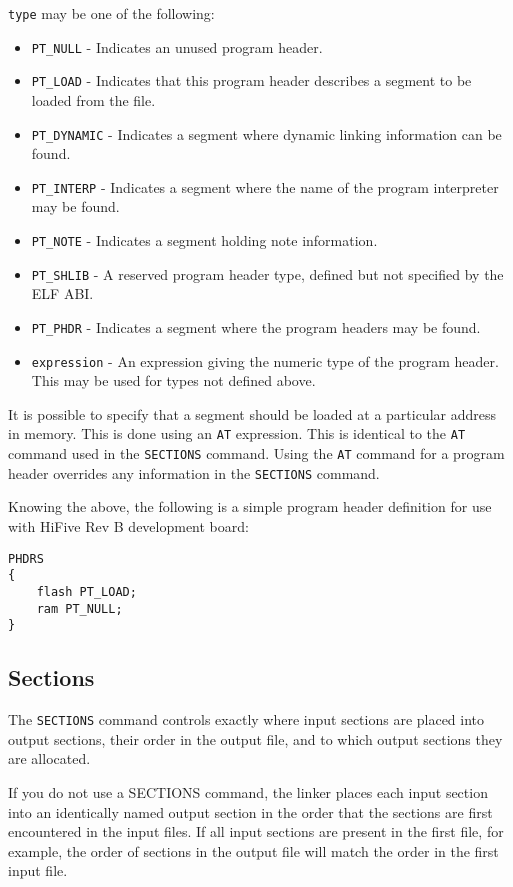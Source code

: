 \lstinline|type| may be one of the following\cite{gnuldProgramHeaders}:
\begin{itemize}
    \item \lstinline|PT_NULL| - Indicates an unused program header.
    \item \lstinline|PT_LOAD| - Indicates that this program header describes a segment to be loaded from the file.
    \item \lstinline|PT_DYNAMIC| - Indicates a segment where dynamic linking information can be found.
    \item \lstinline|PT_INTERP| - Indicates a segment where the name of the program interpreter may be found.
    \item \lstinline|PT_NOTE| - Indicates a segment holding note information.
    \item \lstinline|PT_SHLIB| - A reserved program header type, defined but not specified by the ELF ABI.
    \item \lstinline|PT_PHDR| - Indicates a segment where the program headers may be found.
    \item \lstinline|expression| - An expression giving the numeric type of the program header. This may be used for types not defined above.
\end{itemize}

It is possible to specify that a segment should be loaded at a particular address in memory. This is done using an \lstinline|AT| expression. This is identical to the \lstinline|AT| command used in the \lstinline|SECTIONS| command. Using the \lstinline|AT| command for a program header overrides any information in the \lstinline|SECTIONS| command.\cite{gnuldProgramHeaders}

Knowing the above, the following is a simple program header definition for use with HiFive Rev B development board:
\begin{lstlisting}
PHDRS
{
    flash PT_LOAD;
    ram PT_NULL;
}
\end{lstlisting}

\subsection{Sections}
The \lstinline|SECTIONS| command controls exactly where input sections are placed into output sections, their order in the output file, and to which output sections they are allocated.\cite{gnuldOutputSections}

If you do not use a SECTIONS command, the linker places each input section into an identically named output section in the order that the sections are first encountered in the input files. If all input sections are present in the first file, for example, the order of sections in the output file will match the order in the first input file.\cite{gnuldOutputSections}

